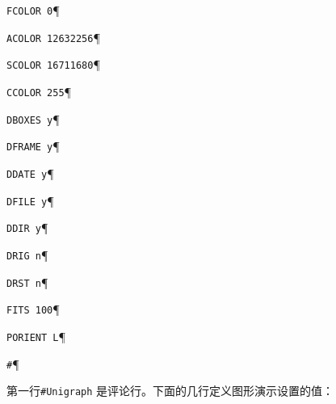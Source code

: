 \verb+FCOLOR 0+\P

\verb+ACOLOR 12632256+\P

\verb+SCOLOR 16711680+\P

\verb+CCOLOR 255+\P

\verb+DBOXES y+\P

\verb+DFRAME y+\P

\verb+DDATE y+\P

\verb+DFILE y+\P

\verb+DDIR y+\P

\verb+DRIG n+\P

\verb+DRST n+\P

\verb+FITS 100+\P

\verb+PORIENT L+\P

\verb+#+\P

\bigskip
\noindent
第一行\verb+#Unigraph+ 是评论行。下面的几行定义图形演示设置的值：



